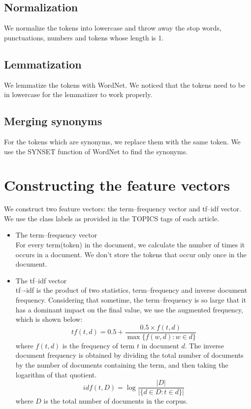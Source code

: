 \documentclass{article}
\begin{document}
\subsection{Normalization}
We normalize the tokens into lowercase and throw away the stop words,
punctuations, numbers and tokens whose length is 1.

\subsection{Lemmatization}
We lemmatize the tokens with WordNet. We noticed that the tokens need to be
in lowercase for the lemmatizer to work properly.

\subsection{Merging synonyms}
For the tokens which are synonyms, we replace them with the same token. We use
the SYNSET function of WordNet to find the synonyms.


\section{Constructing the feature vectors}
We construct two feature vectors: the term--frequency vector and tf--idf vector.
We use the class labels as provided in the TOPICS tags of each article.
\begin{itemize}
  \item The term--frequency vector \\
  For every term(token) in the document, we calculate the number of times it
  occurs in a document. We don't store the tokens that occur only once in the
  document.
  \item The tf--idf vector \\
  tf–-idf is the product of two statistics, term--frequency and inverse document
  frequency.
  Considering that sometime, the term--frequency is so large that it has a
  dominant impact on the final value, we use the augmented frequency, which is
  shown below:
  \begin{equation}
  \mathit{tf}(t,d) = 0.5 + \frac{0.5 \times f(t,d)}{\max\{f(w,d):w \in
  d\}}
  \end{equation}
  where $f(t,d)$ is the frequency of term $t$ in document $d$.
  The inverse document frequency is obtained by dividing the total number of
  documents by the number of documents containing the term, and then taking the
  logarithm of that quotient.
  \begin{equation}
  idf(t, D) = \log\frac{|D|}{|\{d \in D: t \in d\}|}  
  \end{equation}
  where $D$ is the total number of documents in the corpus.
\end{itemize}
\end{document}
